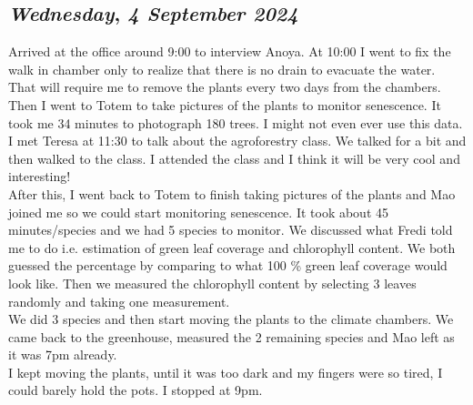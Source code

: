 \def\day{\textit{4 September 2024}}
\def\weekday{\textit{Wednesday}}
\subsection*{\weekday, \day}
Arrived at the office around 9:00 to interview Anoya.
At 10:00 I went to fix the walk in chamber only to realize that there is no drain to evacuate the water. That will require me to remove the plants every two days from the chambers.
Then I went to Totem to take pictures of the plants to monitor senescence. It took me 34 minutes to photograph 180 trees. I might not even ever use this data.\\

I met Teresa at 11:30 to talk about the agroforestry class.  We talked for a bit and then walked to the class. I attended the class and I think it will be very cool and interesting! \\
After this, I went back to Totem to finish taking pictures of the plants and Mao joined me so we could start monitoring senescence. It took about 45 minutes/species and we had 5 species to monitor. We discussed what Fredi told me to do i.e. estimation of green leaf coverage and chlorophyll content. We both guessed the percentage by comparing to what 100 \% green leaf coverage would look like. Then we measured the chlorophyll content by selecting 3 leaves randomly and taking one measurement. \\
We did 3 species and then start moving the plants to the climate chambers. We came back to the greenhouse, measured the 2 remaining species and Mao left as it was 7pm already. \\
I kept moving the plants, until it was too dark and my fingers were so tired, I could barely hold the pots. I stopped at 9pm.

\def\day{\textit{5 September 2024}}
\def\weekday{\textit{Thursday}}
